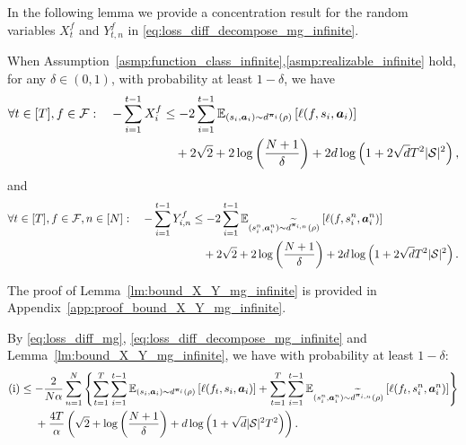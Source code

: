 In the following lemma we provide a concentration result for the random variables $X_{t}^f$ and $Y_{t,n}^f$ in \eqref{eq:loss_diff_decompose_mg_infinite}.
\begin{lm}\label{lm:bound_X_Y_mg_infinite}
    When Assumption~\ref{asmp:function_class_infinite},\ref{asmp:realizable_infinite} hold, for any $\delta \in (0,1)$, with probability at least $1-\delta$, we have
    \begin{align}\label{eq:sum_X_mg_infinite}
        \forall t\in[T],f\in{\mathcal{F}}:\quad -\sum_{i=1}^{t-1} X_i^f &\leq -2\sum_{i=1}^{t-1} \mathbb{E}_{(s_i,{\bm{a}}_i)\sim d^{{\bm{\pi}}_i}(\rho)}\left[\ell(f,s_i,{\bm{a}}_i)\right] \notag\\
        &\quad+ 2\sqrt{2} + 2\log\left(\frac{N+1}{\delta}\right) + 2d\log\left(1+2\sqrt{d}T^2|{\mathcal{S}}|^2\right),
    \end{align}
    and 
    \begin{align}\label{eq:sum_Y_mg_infinite}
        \forall t\in[T],f\in{\mathcal{F}},n\in[N]:\quad -\sum_{i=1}^{t-1} Y_{i,n}^f &\leq -2\sum_{i=1}^{t-1} \mathbb{E}_{(s_i^n,{\bm{a}}_i^n)\sim d^{\widetilde{{\bm{\pi}}}_{i,n}}(\rho)}\left[\ell(f,s_i^n,{\bm{a}}_i^n)\right] \notag\\
        &\quad+ 2\sqrt{2} + 2\log\left(\frac{N+1}{\delta}\right) + 2d\log\left(1+2\sqrt{d}T^2|{\mathcal{S}}|^2\right).
    \end{align}
\end{lm}
The proof of Lemma~\ref{lm:bound_X_Y_mg_infinite} is provided in Appendix~\ref{app:proof_bound_X_Y_mg_infinite}.

By \eqref{eq:loss_diff_mg}, \eqref{eq:loss_diff_decompose_mg_infinite} and Lemma~\ref{lm:bound_X_Y_mg_infinite}, we have with probability at least $1-\delta$:
\begin{align}\label{eq:a_bound'}
    \text{(i)}&\leq -\frac{2}{N\alpha}\sum_{n=1}^N\left\{\sum_{t=1}^T\sum_{i=1}^{t-1} 
    \E_{(s_i,\va_i)\sim d^{\vpi_i}(\rho)}\left[\ell(f_t,s_i,\va_i)\right]+\sum_{t=1}^T\sum_{i=1}^{t-1} 
    \E_{(s_i^n,\va_i^n)\sim d^{\widetilde{\vpi}_{i,n}}(\rho)}\left[\ell(f_t,s_i^n,\va_i^n)\right]\right\}\notag\\
    &\quad\,\, + \frac{4T}{\alpha}\left(\sqrt{2} + \log\left(\frac{N+1}{\delta}\right) + d\log\left(1+\sqrt{d}|\gS|^2T^2\right)\right).%
\end{align}

